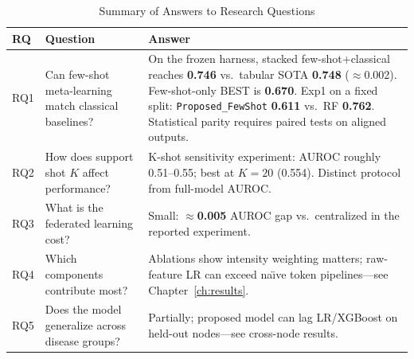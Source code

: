 \begin{table}[htbp]
\centering
\caption{Summary of Answers to Research Questions}
\begin{tabular}{p{1.2cm}p{5.5cm}p{6.5cm}}
\toprule
\textbf{RQ} & \textbf{Question} & \textbf{Answer} \\
\midrule
RQ1 & Can few-shot meta-learning match classical baselines? & On the frozen harness, stacked few-shot+classical reaches \textbf{0.746} vs.\ tabular SOTA \textbf{0.748} ($\approx$0.002). Few-shot-only BEST is \textbf{0.670}. Exp1 on a fixed split: \texttt{Proposed\_FewShot} \textbf{0.611} vs.\ RF \textbf{0.762}. Statistical parity requires paired tests on aligned outputs. \\
RQ2 & How does support shot $K$ affect performance? & K-shot sensitivity experiment: AUROC roughly 0.51--0.55; best at $K{=}20$ (0.554). Distinct protocol from full-model AUROC. \\
RQ3 & What is the federated learning cost? & Small: $\approx$\textbf{0.005} AUROC gap vs.\ centralized in the reported experiment. \\
RQ4 & Which components contribute most? & Ablations show intensity weighting matters; raw-feature LR can exceed na\"{\i}ve token pipelines---see Chapter~\ref{ch:results}. \\
RQ5 & Does the model generalize across disease groups? & Partially; proposed model can lag LR/XGBoost on held-out nodes---see cross-node results. \\
\bottomrule
\end{tabular}
\label{tab:rq_answers}
\end{table}
